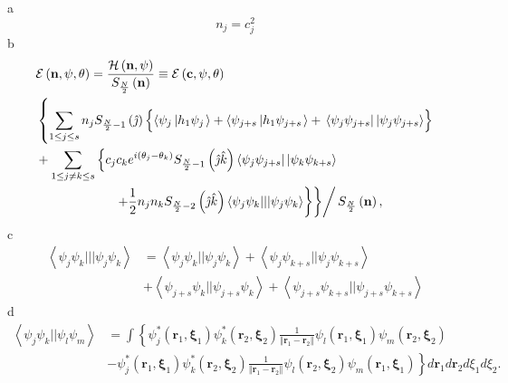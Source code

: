 \documentclass[aps,preprint]{revtex4}%
\begin{document}
a%
\[
n_{j}=c_{j}^{2}%
\]
b%
\begin{align*}
&  \mathcal{E}\left(  \mathbf{n},\mathbf{\psi,\theta}\right)  =\frac
{\mathcal{H}\left(  \mathbf{n},\mathbf{\psi}\right)  }{S_{\frac{N}{2}}\left(
\mathbf{n}\right)  }\equiv\mathcal{E}\left(  \mathbf{c},\mathbf{\psi,\theta
}\right) \\
&  \left\{  \sum_{1\leq j\leq s}n_{j}S_{\frac{N}{2}-1}\left(  \hat{\jmath
}\right)  \left\{  \overset{}{\left\langle \psi_{j}\left\vert h_{1}\psi
_{j}\right.  \right\rangle +\left\langle \psi_{j+s}\left\vert h_{1}\psi
_{j+s}\right.  \right\rangle }+\,\left\langle \psi_{j}\psi_{j+s}\right\vert
\left\vert \psi_{j}\psi_{j+s}\right\rangle \right\}  \right. \\
&  +\sum_{1\leq j\neq k\leq s}\left\{  c_{j}c_{k}e^{i\left(  \theta_{j}%
-\theta_{k}\right)  }S_{\frac{N}{2}-1}\left(  \hat{\jmath}\hat{k}\right)
\left\langle \psi_{j}\psi_{j+s}\right\vert \left\vert \psi_{k}\psi
_{k+s}\right\rangle \right. \\
&  \qquad\qquad\qquad\left.  \left.  \left.  +\frac{1}{2}\overset{}{n_{j}%
n_{k}S_{\frac{N}{2}-2}\left(  \hat{\jmath}\hat{k}\right)  \left\langle
\psi_{j}\psi_{k}|||\psi_{j}\psi_{k}\right\rangle }\right\}  \right\}  \right/
S_{\frac{N}{2}}\left(  \mathbf{n}\right)  ,
\end{align*}
c%
\begin{align*}
\left\langle \psi_{j}\psi_{k}|||\psi_{j}\psi_{k}\right\rangle  &
=\left\langle \psi_{j}\psi_{k}||\psi_{j}\psi_{k}\right\rangle +\left\langle
\psi_{j}\psi_{k+s}||\psi_{j}\psi_{k+s}\right\rangle \\
&  +\left\langle \psi_{j+s}\psi_{k}||\psi_{j+s}\psi_{k}\right\rangle
+\left\langle \psi_{j+s}\psi_{k+s}||\psi_{j+s}\psi_{k+s}\right\rangle
\end{align*}
d%
\begin{align*}
\left\langle \psi_{j}\psi_{k}||\psi_{l}\psi_{m}\right\rangle  &  =\int\left\{
\psi_{j}^{\ast}\left(  \mathbf{r}_{1}\mathbf{,\xi}_{1}\right)  \psi_{k}^{\ast
}\left(  \mathbf{r}_{2}\mathbf{,\xi}_{2}\right)  \frac{1}{\left\Vert
\mathbf{r}_{1}-\mathbf{r}_{2}\right\Vert }\psi_{l}\left(  \mathbf{r}%
_{1}\mathbf{,\xi}_{1}\right)  \psi_{m}\left(  \mathbf{r}_{2}\mathbf{,\xi}%
_{2}\right)  \right. \\
&  -\left.  \psi_{j}^{\ast}\left(  \mathbf{r}_{1}\mathbf{,\xi}_{1}\right)
\psi_{k}^{\ast}\left(  \mathbf{r}_{2}\mathbf{,\xi}_{2}\right)  \frac
{1}{\left\Vert \mathbf{r}_{1}-\mathbf{r}_{2}\right\Vert }\psi_{l}\left(
\mathbf{r}_{2}\mathbf{,\xi}_{2}\right)  \psi_{m}\left(  \mathbf{r}%
_{1}\mathbf{,\xi}_{1}\right)  \right\}  d\mathbf{r}_{1}d\mathbf{r}_{2}d\xi
_{1}d\xi_{2}.
\end{align*}
\end{document}
